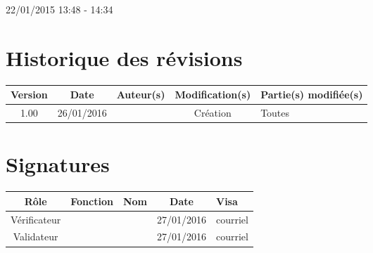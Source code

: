 \documentclass [a4paper] {article}
\begin{document}
22/01/2015			 				%
\hfill   
\hfill 	 13:48 - 14:34 				%



\section*{Historique des révisions}
\begin{center}
			\begin{tabular}{| c | c | c | c | p{4cm} |}
				\hline
				\rowcolor{Gray}
				Version & Date & Auteur(s) & Modification(s) & Partie(s) modifiée(s)		 \\
				\hline
				1.00 & 26/01/2016 & \Kafui & Création & Toutes \\
		\hline		
			\end{tabular}
		\end{center}

\section*{Signatures}

		\begin{center}
			\begin{tabular}{| c | c | c | c | p{4cm} |}
				\hline
				\rowcolor{Gray}
				Rôle & Fonction & Nom & Date & Visa		 \\
				\hline
				Vérificateur & \RQA & \Pierre & 27/01/2016 & courriel \\[30pt]
				\hline
				Validateur & \CP & \Sergi & 27/01/2016 & courriel \\[30pt]	
				\hline
			\end{tabular}
		\end{center}
		
\newpage		




\end{document}
